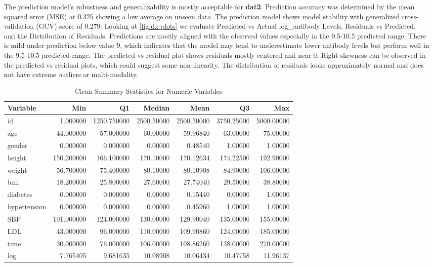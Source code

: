 \documentclass[
]{article}
\begin{document}
The prediction model's robustness and generalizability is mostly acceptable for \textbf{dat2}. Prediction accuracy was determined by the mean squared error (MSE) at 0.325 showing a low average on unseen data. The prediction model shows model stability with generalized cross-validation (GCV) score of 0.279. Looking at \ref{fig:dx-plots} we evaluate Predicted vs Actual log\_antibody Levels, Residuals vs Predicted, and the Distribution of Residuals. Predictions are mostly aligned with the observed values especially in the 9.5-10.5 predicted range. There is mild under-prediction below value 9, which indicates that the model may tend to underestimate lower antibody levels but perform well in the 9.5-10.5 predicted range. The predicted vs residual plot shows residuals mostly centered and near 0. Right-skewness can be observed in the predicted vs residual plots, which could suggest some non-linearity. The distribution of residuals looks approximately normal and does not have extreme outliers or multi-modality.

\newpage

\begin{table}

\caption{\label{tab:unnamed-chunk-4}Clean Summary Statistics for Numeric Variables}
\centering
\begin{tabular}[t]{l|r|r|r|r|r|r}
\hline
Variable & Min & Q1 & Median & Mean & Q3 & Max\\
\hline
id & 1.000000 & 1250.750000 & 2500.50000 & 2500.50000 & 3750.25000 & 5000.00000\\
\hline
age & 44.000000 & 57.000000 & 60.00000 & 59.96840 & 63.00000 & 75.00000\\
\hline
gender & 0.000000 & 0.000000 & 0.00000 & 0.48540 & 1.00000 & 1.00000\\
\hline
height & 150.200000 & 166.100000 & 170.10000 & 170.12634 & 174.22500 & 192.90000\\
\hline
weight & 56.700000 & 75.400000 & 80.10000 & 80.10908 & 84.90000 & 106.00000\\
\hline
bmi & 18.200000 & 25.800000 & 27.60000 & 27.74040 & 29.50000 & 38.80000\\
\hline
diabetes & 0.000000 & 0.000000 & 0.00000 & 0.15440 & 0.00000 & 1.00000\\
\hline
hypertension & 0.000000 & 0.000000 & 0.00000 & 0.45960 & 1.00000 & 1.00000\\
\hline
SBP & 101.000000 & 124.000000 & 130.00000 & 129.90040 & 135.00000 & 155.00000\\
\hline
LDL & 43.000000 & 96.000000 & 110.00000 & 109.90860 & 124.00000 & 185.00000\\
\hline
time & 30.000000 & 76.000000 & 106.00000 & 108.86260 & 138.00000 & 270.00000\\
\hline
log & 7.765405 & 9.681635 & 10.08908 & 10.06434 & 10.47758 & 11.96137\\
\hline
\end{tabular}
\end{table}
\end{document}
